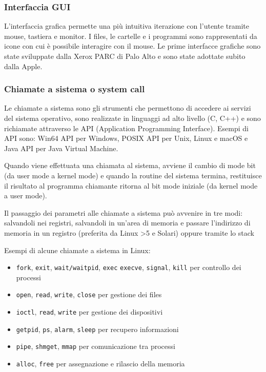 \documentclass[a4paper]{article}
\begin{document}
\subsubsection*{Interfaccia GUI}
L'interfaccia grafica permette una più intuitiva iterazione con l'utente tramite mouse, tastiera e monitor. I files, le cartelle
e i programmi sono rappresentati da icone con cui è possibile interagire con il mouse. Le prime interfacce grafiche sono state
sviluppate dalla Xerox PARC di Palo Alto e sono state adottate subito dalla Apple.

\subsubsection*{Chiamate a sistema o system call}
Le chiamate a sistema sono gli strumenti che permettono di accedere ai servizi del sistema operativo, sono realizzate in linguaggi
ad alto livello (C, C++) e sono richiamate attraverso le API (Application Programming Interface). Esempi di API sono: Win64 API
per Windows, POSIX API per Unix, Linux e macOS e Java API per Java Virtual Machine.

Quando viene effettuata una chiamata al sistema, avviene il cambio di mode bit (da user mode a kernel mode) e quando la routine
del sistema termina, restituisce il risultato al programma chiamante ritorna al bit mode iniziale (da kernel mode a user mode).

Il passaggio dei parametri alle chiamate a sistema può avvenire in tre modi: salvandoli nei registri, salvandoli in un'area di
memoria e passare l'indirizzo di memoria in un registro (preferita da Linux >5 e Solari) oppure tramite lo stack

Esempi di alcune chiamate a sistema in Linux:
\begin{itemize}
	\item \texttt{fork}, \texttt{exit}, \texttt{wait/waitpid}, \texttt{exec} \texttt{execve}, \texttt{signal}, \texttt{kill} per controllo dei processi
	\item \texttt{open}, \texttt{read}, \texttt{write}, \texttt{close} per gestione dei files
	\item \texttt{ioctl}, \texttt{read}, \texttt{write} per gestione dei dispositivi
	\item \texttt{getpid}, \texttt{ps}, \texttt{alarm}, \texttt{sleep} per recupero informazioni
	\item \texttt{pipe}, \texttt{shmget}, \texttt{mmap} per comunicazione tra processi
	\item \texttt{alloc}, \texttt{free} per assegnazione e rilascio della memoria
\end{itemize}
\end{document}
